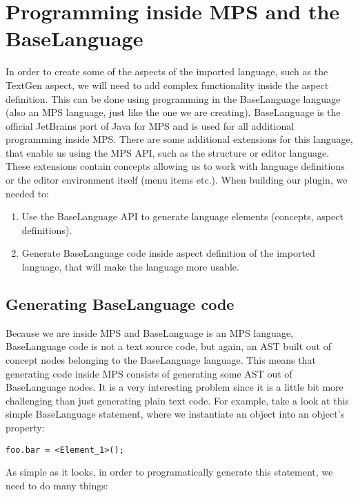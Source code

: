 \section{Programming inside MPS and the BaseLanguage}
\label{chap:generating_code_inside_mps}

In order to create some of the aspects of the imported language, such as the TextGen aspect, we will need to add complex functionality inside the aspect definition.
This can be done using programming in the BaseLanguage language (also an MPS language, just like the one we are creating).
BaseLanguage is the official JetBrains port of Java for MPS and is used for all additional programming inside MPS.
There are some additional extensions for this language, that enable us using the MPS API, such as the structure or editor language.
These extensions contain concepts allowing us to work with language definitions or the editor environment itself (menu items etc.).
When building our plugin, we needed to:

\begin{enumerate}
	\item Use the BaseLanguage API to generate language elements (concepts, aspect definitions).

	\item Generate BaseLanguage code inside aspect definition of the imported language, that will make the language more usable.
\end{enumerate}

\subsection{Generating BaseLanguage code}

Because we are inside MPS and BaseLanguage is an MPS language, BaseLanguage code is not a text source code, but again, an AST built out of concept nodes belonging to the BaseLanguage language.
This means that generating code inside MPS consists of generating some AST out of BaseLanguage nodes.
It is a very interesting problem since it is a little bit more challenging than just generating plain text code.
For example, take a look at this simple BaseLanguage statement, where we instantiate an object into an object's property:

\begin{center}
	\texttt{foo.bar = <Element{\_}1>();}
\end{center}

\noindent
As simple as it looks, in order to programatically generate this statement, we need to do many things:

